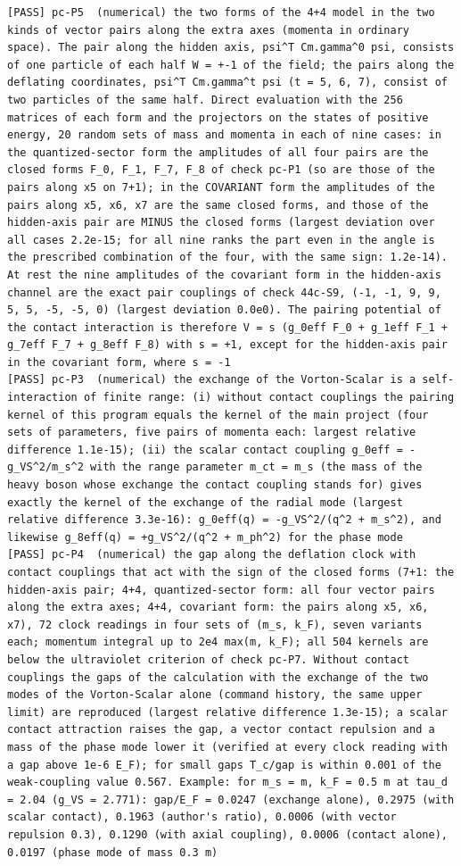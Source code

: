 \documentclass[
  10pt,
]{article}
\begin{document}
\begin{verbatim}
[PASS] pc-P5  (numerical) the two forms of the 4+4 model in the two kinds of vector pairs along the extra axes (momenta in ordinary space). The pair along the hidden axis, psi^T Cm.gamma^0 psi, consists of one particle of each half W = +-1 of the field; the pairs along the deflating coordinates, psi^T Cm.gamma^t psi (t = 5, 6, 7), consist of two particles of the same half. Direct evaluation with the 256 matrices of each form and the projectors on the states of positive energy, 20 random sets of mass and momenta in each of nine cases: in the quantized-sector form the amplitudes of all four pairs are the closed forms F_0, F_1, F_7, F_8 of check pc-P1 (so are those of the pairs along x5 on 7+1); in the COVARIANT form the amplitudes of the pairs along x5, x6, x7 are the same closed forms, and those of the hidden-axis pair are MINUS the closed forms (largest deviation over all cases 2.2e-15; for all nine ranks the part even in the angle is the prescribed combination of the four, with the same sign: 1.2e-14). At rest the nine amplitudes of the covariant form in the hidden-axis channel are the exact pair couplings of check 44c-S9, (-1, -1, 9, 9, 5, 5, -5, -5, 0) (largest deviation 0.0e0). The pairing potential of the contact interaction is therefore V = s (g_0eff F_0 + g_1eff F_1 + g_7eff F_7 + g_8eff F_8) with s = +1, except for the hidden-axis pair in the covariant form, where s = -1
[PASS] pc-P3  (numerical) the exchange of the Vorton-Scalar is a self-interaction of finite range: (i) without contact couplings the pairing kernel of this program equals the kernel of the main project (four sets of parameters, five pairs of momenta each: largest relative difference 1.1e-15); (ii) the scalar contact coupling g_0eff = -g_VS^2/m_s^2 with the range parameter m_ct = m_s (the mass of the heavy boson whose exchange the contact coupling stands for) gives exactly the kernel of the exchange of the radial mode (largest relative difference 3.3e-16): g_0eff(q) = -g_VS^2/(q^2 + m_s^2), and likewise g_8eff(q) = +g_VS^2/(q^2 + m_ph^2) for the phase mode
[PASS] pc-P4  (numerical) the gap along the deflation clock with contact couplings that act with the sign of the closed forms (7+1: the hidden-axis pair; 4+4, quantized-sector form: all four vector pairs along the extra axes; 4+4, covariant form: the pairs along x5, x6, x7), 72 clock readings in four sets of (m_s, k_F), seven variants each; momentum integral up to 2e4 max(m, k_F); all 504 kernels are below the ultraviolet criterion of check pc-P7. Without contact couplings the gaps of the calculation with the exchange of the two modes of the Vorton-Scalar alone (command history, the same upper limit) are reproduced (largest relative difference 1.3e-15); a scalar contact attraction raises the gap, a vector contact repulsion and a mass of the phase mode lower it (verified at every clock reading with a gap above 1e-6 E_F); for small gaps T_c/gap is within 0.001 of the weak-coupling value 0.567. Example: for m_s = m, k_F = 0.5 m at tau_d = 2.04 (g_VS = 2.771): gap/E_F = 0.0247 (exchange alone), 0.2975 (with scalar contact), 0.1963 (author's ratio), 0.0006 (with vector repulsion 0.3), 0.1290 (with axial coupling), 0.0006 (contact alone), 0.0197 (phase mode of mass 0.3 m)

\end{verbatim}
\end{document}
